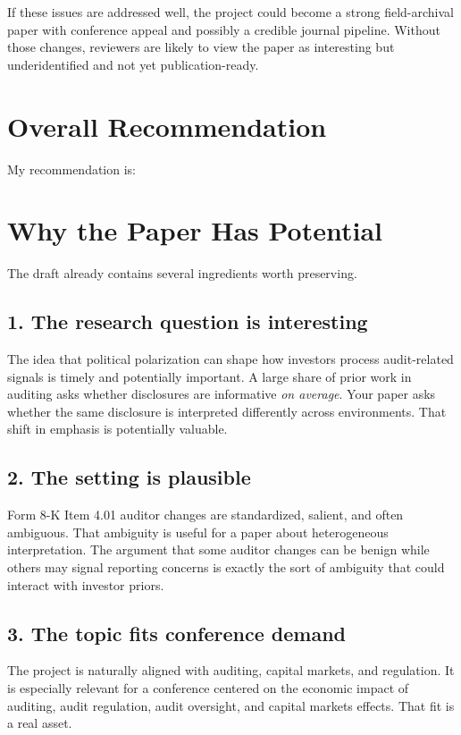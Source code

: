 \documentclass[12pt]{article}
\begin{document}
If these issues are addressed well, the project could become a strong field-archival paper with conference appeal and possibly a credible journal pipeline. Without those changes, reviewers are likely to view the paper as interesting but underidentified and not yet publication-ready.

\section*{Overall Recommendation}
My recommendation is:
\begin{center}
\end{center}

\section{Why the Paper Has Potential}
The draft already contains several ingredients worth preserving.

\subsection*{1. The research question is interesting}
The idea that political polarization can shape how investors process audit-related signals is timely and potentially important. A large share of prior work in auditing asks whether disclosures are informative \emph{on average}. Your paper asks whether the same disclosure is interpreted differently across environments. That shift in emphasis is potentially valuable.

\subsection*{2. The setting is plausible}
Form 8-K Item 4.01 auditor changes are standardized, salient, and often ambiguous. That ambiguity is useful for a paper about heterogeneous interpretation. The argument that some auditor changes can be benign while others may signal reporting concerns is exactly the sort of ambiguity that could interact with investor priors.

\subsection*{3. The topic fits conference demand}
The project is naturally aligned with auditing, capital markets, and regulation. It is especially relevant for a conference centered on the economic impact of auditing, audit regulation, audit oversight, and capital markets effects. That fit is a real asset.
\end{document}
